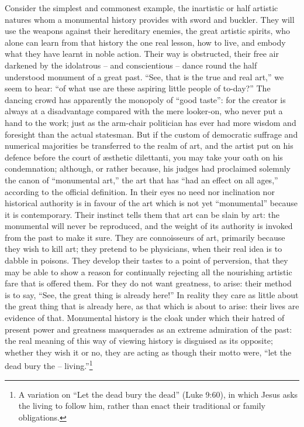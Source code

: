 Consider the simplest and commonest example, the inartistic or half
artistic natures whom a monumental history provides with sword and
buckler. They will use the weapons against their hereditary enemies,
the great artistic spirits, who alone can learn from that history the
one real lesson, how to live, and embody what they have learnt in
noble action. Their way is obstructed, their free air darkened by the
idolatrous -- and conscientious -- dance round the half understood
monument of a great past. \enquote{See, that is the true and real art,} we
seem to hear: \enquote{of what use are these aspiring little people of
to-day?} The dancing crowd has apparently the monopoly of \enquote{good
taste}: for the creator is always at a disadvantage compared with the
mere looker-on, who never put a hand to the work; just as the
arm-chair politician has ever had more wisdom and foresight than the
actual statesman. But if the custom of democratic suffrage and
numerical majorities be transferred to the realm of art, and the
artist put on his defence before the court of æsthetic dilettanti,
you may take your oath on his condemnation; although, or rather
because, his judges had proclaimed solemnly the canon of \enquote{monumental
art,} the art that has \enquote{had an effect on all ages,} according to the
official definition. In their eyes no need nor inclination nor
historical authority is in favour of the art which is not yet
\enquote{monumental} because it is contemporary. Their instinct tells them
that art can be slain by art: the monumental will never be
reproduced, and the weight of its authority is invoked from the past
to make it sure. They are connoisseurs of art, primarily because they
wish to kill art; they pretend to be physicians, when their real idea
is to dabble in poisons. They develop their tastes to a point of
perversion, that they may be able to show a reason for continually
rejecting all the nourishing artistic fare that is offered them. For
they do not want greatness, to arise: their method is to say, \enquote{See,
the great thing is already here!} In reality they care as little
about the great thing that is already here, as that which is about to
arise: their lives are evidence of that. Monumental history is the
cloak under which their hatred of present power and greatness
masquerades as an extreme admiration of the past: the real meaning of
this way of viewing history is disguised as its opposite; whether
they wish it or no, they are acting as though their motto were, \enquote{let
the dead bury the -- living.}\footnote{A variation on \enquote{Let the dead bury the dead} (Luke 9:60), in which Jesus asks the living to follow him, rather than enact their traditional or family obligations.}

